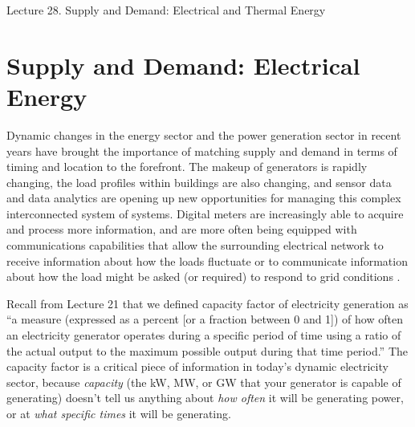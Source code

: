 \documentclass[10pt]{article}
\begin{document}
   \noindent
   \begin{center}

   \hrulefill
   
   \vspace{5pt}
   
   \vspace{0pt}
   
   {\Large \hfill  Lecture 28. Supply and Demand: Electrical and Thermal Energy}
   \vspace{5pt}
   
  
   \hrulefill
   \end{center}
   
   
   {}
   



\section{Supply and Demand: Electrical Energy}




Dynamic changes in the energy sector and the power generation sector in recent years have brought the importance of matching supply and demand in terms of timing and location to the forefront. The makeup of generators is rapidly changing, the load profiles within buildings are also changing, and sensor data and data analytics are opening up new opportunities for managing this complex interconnected system of systems. Digital meters are increasingly able to acquire and process more information, and are more often being equipped with communications capabilities that allow the surrounding electrical network to receive information about how the loads fluctuate or to communicate information about how the load might be asked (or required) to respond to grid conditions \cite{newenergyfuture}.

Recall from Lecture 21 that we defined
capacity factor of electricity generation as ``a measure (expressed as a percent [or a fraction between 0 and 1]) of how often an electricity generator operates during a specific period of time using a ratio of the actual output to the maximum possible output during that time period.'' %
The capacity factor is a critical piece of information in today's dynamic electricity sector, because \textit{capacity} (the kW, MW, or GW that your generator is capable of generating) doesn't tell us anything about \textit{how often} it will be generating power, or at \textit{what specific times} it will be generating.
\end{document}
